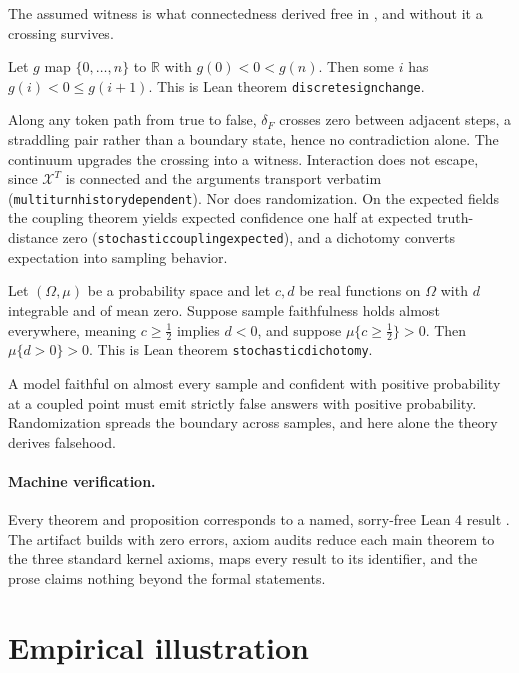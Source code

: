 \documentclass[mlmain,onecolumn]{jmlr}
\newcommand{\X}{\mathcal{X}}
\newcommand{\R}{\mathbb{R}}
\newcommand{\dF}{\delta_{\!F}}
\newcommand{\leanid}[1]{{\def\_{\textunderscore\allowbreak}\texttt{#1}}}
\begin{document}
The assumed witness is what connectedness derived free in
, and without it a crossing survives.

\begin{proposition}
\label{prop:discrete-ivt}
Let $g$ map $\{0, \dots, n\}$ to $\R$ with $g(0) < 0 < g(n)$. Then
some $i$ has $g(i) < 0 \le g(i+1)$. This is Lean theorem
\leanid{discrete\_sign\_change}.
\end{proposition}

Along any token path from true to false, $\dF$ crosses zero between
adjacent steps, a straddling pair rather than a boundary state,
hence no contradiction alone. The continuum upgrades the
crossing into a witness. Interaction does not escape, since $\X^T$
is connected and the arguments transport verbatim
(\leanid{multi\_turn\_history\_dependent}). Nor does randomization.
On the expected fields the coupling theorem yields expected
confidence one half at expected truth-distance zero
(\leanid{stochastic\_coupling\_expected}), and a dichotomy converts
expectation into sampling behavior.

\begin{theorem}
\label{thm:dichotomy}
Let $(\Omega, \mu)$ be a probability space and let $c, d$ be real
functions on $\Omega$ with $d$ integrable and of mean zero. Suppose
sample faithfulness holds almost everywhere, meaning
$c \ge \tfrac12$ implies $d < 0$, and suppose
$\mu\{c \ge \tfrac12\} > 0$. Then $\mu\{d > 0\} > 0$. This is Lean
theorem \leanid{stochastic\_dichotomy}.
\end{theorem}

A model faithful on almost every sample and confident with positive
probability at a coupled point must emit strictly false answers with
positive probability. Randomization spreads the boundary across
samples, and here alone the theory derives falsehood.

\paragraph{Machine verification.}
\label{sec:lean}
Every theorem and proposition corresponds to a named, sorry-free
Lean 4 result \citep{moura2021lean,mathlib2020}. The artifact
builds with zero errors, axiom audits reduce each main theorem to
the three standard kernel axioms,  maps every
result to its identifier, and the prose claims nothing beyond the
formal statements.

\section{Empirical illustration}
\label{sec:experiments}
\label{app:experiment}
\end{document}
